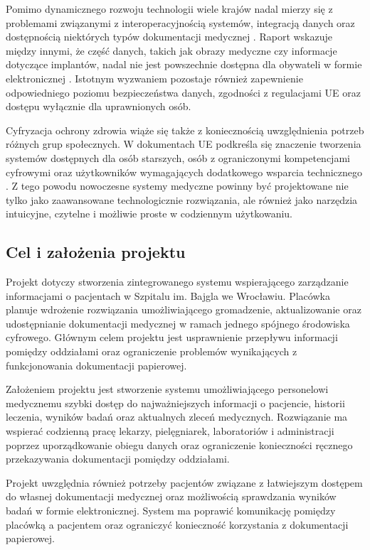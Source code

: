 Pomimo dynamicznego rozwoju technologii wiele krajów nadal mierzy się z problemami związanymi z interoperacyjnością systemów, integracją danych oraz dostępnością niektórych typów dokumentacji medycznej \cite{EU_eHealth_2024}. Raport wskazuje między innymi, że część danych, takich jak obrazy medyczne czy informacje dotyczące implantów, nadal nie jest powszechnie dostępna dla obywateli w formie elektronicznej \cite{EU_eHealth_2024}. Istotnym wyzwaniem pozostaje również zapewnienie odpowiedniego poziomu bezpieczeństwa danych, zgodności z regulacjami UE oraz dostępu wyłącznie dla uprawnionych osób.

Cyfryzacja ochrony zdrowia wiąże się także z koniecznością uwzględnienia potrzeb różnych grup społecznych. W dokumentach UE podkreśla się znaczenie tworzenia systemów dostępnych dla osób starszych, osób z ograniczonymi kompetencjami cyfrowymi oraz użytkowników wymagających dodatkowego wsparcia technicznego \cite{EU_eHealth_2024}. Z tego powodu nowoczesne systemy medyczne powinny być projektowane nie tylko jako zaawansowane technologicznie rozwiązania, ale również jako narzędzia intuicyjne, czytelne i możliwie proste w codziennym użytkowaniu.

\subsection{Cel i założenia projektu}

Projekt dotyczy stworzenia zintegrowanego systemu wspierającego zarządzanie informacjami o pacjentach w Szpitalu im. Bajgla we Wrocławiu. Placówka planuje wdrożenie rozwiązania umożliwiającego gromadzenie, aktualizowanie oraz udostępnianie dokumentacji medycznej w ramach jednego spójnego środowiska cyfrowego. Głównym celem projektu jest usprawnienie przepływu informacji pomiędzy oddziałami oraz ograniczenie problemów wynikających z funkcjonowania dokumentacji papierowej.

Założeniem projektu jest stworzenie systemu umożliwiającego personelowi medycznemu szybki dostęp do najważniejszych informacji o pacjencie, historii leczenia, wyników badań oraz aktualnych zleceń medycznych. Rozwiązanie ma wspierać codzienną pracę lekarzy, pielęgniarek, laboratoriów i administracji poprzez uporządkowanie obiegu danych oraz ograniczenie konieczności ręcznego przekazywania dokumentacji pomiędzy oddziałami.

Projekt uwzględnia również potrzeby pacjentów związane z łatwiejszym dostępem do własnej dokumentacji medycznej oraz możliwością sprawdzania wyników badań w formie elektronicznej. System ma poprawić komunikację pomiędzy placówką a pacjentem oraz ograniczyć konieczność korzystania z dokumentacji papierowej.

